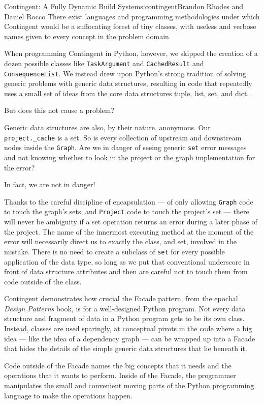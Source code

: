 \begin{aosachapter}{Contingent: A Fully Dynamic Build System}{s:contingent}{Brandon Rhodes and Daniel Rocco}
There exist languages and programming methodologies under which
Contingent would be a suffocating forest of tiny classes, with useless
and verbose names given to every concept in the problem domain.

When programming Contingent in Python, however, we skipped the creation
of a dozen possible classes like \texttt{TaskArgument} and
\texttt{CachedResult} and \texttt{ConsequenceList}. We instead drew upon
Python's strong tradition of solving generic problems with generic data
structures, resulting in code that repeatedly uses a small set of ideas
from the core data structures tuple, list, set, and dict.

But does this not cause a problem?

Generic data structures are also, by their nature, anonymous. Our
\texttt{project.\_cache} is a set. So is every collection of upstream
and downstream nodes inside the \texttt{Graph}. Are we in danger of
seeing generic \texttt{set} error messages and not knowing whether to
look in the project or the graph implementation for the error?

In fact, we are not in danger!

Thanks to the careful discipline of encapsulation --- of only allowing
\texttt{Graph} code to touch the graph's sets, and \texttt{Project} code
to touch the project's set --- there will never be ambiguity if a set
operation returns an error during a later phase of the project. The name
of the innermost executing method at the moment of the error will
necessarily direct us to exactly the class, and set, involved in the
mistake. There is no need to create a subclass of \texttt{set} for every
possible application of the data type, so long as we put that
conventional underscore in front of data structure attributes and then
are careful not to touch them from code outside of the class.

Contingent demonstrates how crucial the Facade pattern, from the epochal
\emph{Design Patterns} book, is for a well-designed Python program. Not
every data structure and fragment of data in a Python program gets to be
its own class. Instead, classes are used sparingly, at conceptual pivots
in the code where a big idea --- like the idea of a dependency graph ---
can be wrapped up into a Facade that hides the details of the simple
generic data structures that lie beneath it.

Code outside of the Facade names the big concepts that it needs and the
operations that it wants to perform. Inside of the Facade, the
programmer manipulates the small and convenient moving parts of the
Python programming language to make the operations happen.

\end{aosachapter}
